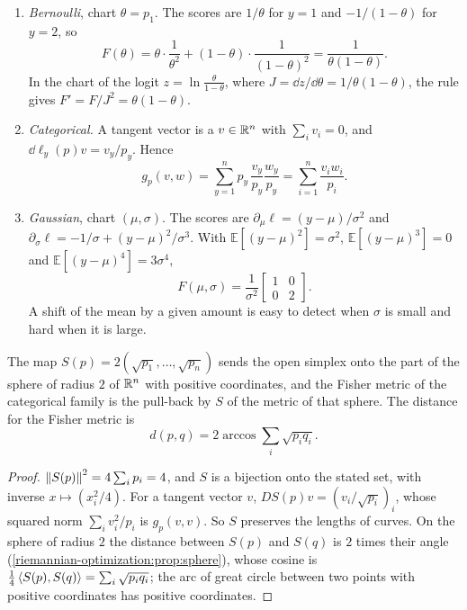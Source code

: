 \begin{notechapter}
\begin{example}
\label{natural-gradient:ex:fisher}
\begin{enumerate}[nosep]
  \item \emph{Bernoulli}, chart $\theta = p_1$. The scores are
        $1/\theta$ for $y = 1$ and $-1/(1 - \theta)$ for $y = 2$, so
        \[
          F(\theta) = \theta\cdot\frac1{\theta^2}
          + (1 - \theta)\cdot\frac1{(1 - \theta)^2}
          = \frac1{\theta(1 - \theta)} .
        \]
        In the chart of the logit $z = \ln\frac\theta{1 - \theta}$, where
        $J = \dd z/\dd\theta = 1/\theta(1 - \theta)$, the rule gives
        $F' = F/J^2 = \theta(1 - \theta)$.
  \item \emph{Categorical.} A tangent vector is a $v\in\mathbb{R}^n$ with
        $\sum_iv_i = 0$, and $\dd\ell_y(p)v = v_y/p_y$. Hence
        \[
          g_p(v, w) = \sum_{y=1}^np_y\,\frac{v_y}{p_y}\frac{w_y}{p_y}
          = \sum_{i=1}^n\frac{v_iw_i}{p_i} .
        \]
  \item \emph{Gaussian}, chart $(\mu, \sigma)$. The scores are
        $\partial_\mu\ell = (y - \mu)/\sigma^2$ and
        $\partial_\sigma\ell = -1/\sigma + (y - \mu)^2/\sigma^3$. With
        $\mathbb E[(y - \mu)^2] = \sigma^2$,
        $\mathbb E[(y - \mu)^3] = 0$ and
        $\mathbb E[(y - \mu)^4] = 3\sigma^4$,
        \[
          F(\mu, \sigma) = \frac1{\sigma^2}
          \begin{bmatrix}1 & 0\\ 0 & 2\end{bmatrix} .
        \]
        A shift of the mean by a given amount is easy to detect when
        $\sigma$ is small and hard when it is large.
\end{enumerate}
\end{example}

\begin{proposition}
\label{natural-gradient:prop:sphere}
The map $S(p) = 2(\sqrt{p_1},\dots,\sqrt{p_n})$ sends the open simplex
onto the part of the sphere of radius $2$ of $\mathbb{R}^n$ with positive
coordinates, and the Fisher metric of the categorical family is the
pull-back by $S$ of the metric of that sphere. The distance for the
Fisher metric is
\[
  d(p, q) = 2\arccos\sum_i\sqrt{p_iq_i} .
\]
\end{proposition}

\begin{proof}
$\left\|S(p)\right\|^2 = 4\sum_ip_i = 4$, and $S$ is a bijection onto the stated
set, with inverse $x\mapsto(x_i^2/4)$. For a tangent vector $v$,
$DS(p)v = (v_i/\sqrt{p_i})_i$, whose squared norm
$\sum_iv_i^2/p_i$ is $g_p(v, v)$. So $S$ preserves the lengths of curves.
On the sphere of radius $2$ the distance between $S(p)$ and $S(q)$ is $2$
times their angle (\cref{riemannian-optimization:prop:sphere}), whose
cosine is $\frac14\left\langle S(p), S(q) \right\rangle = \sum_i\sqrt{p_iq_i}$; the arc of
great circle between two points with positive coordinates has positive
coordinates.
\end{proof}


\end{notechapter}
